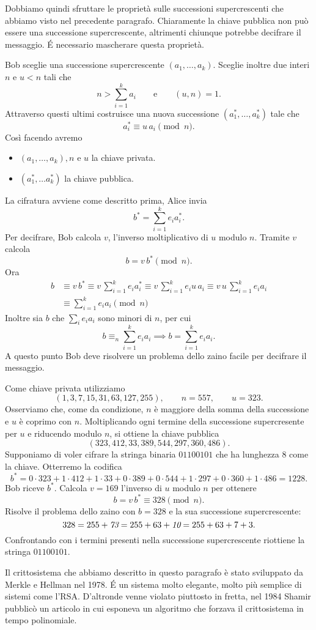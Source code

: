 	Dobbiamo quindi sfruttare le proprietà sulle successioni supercrescenti che abbiamo visto nel precedente paragrafo.
	Chiaramente la chiave pubblica non può essere una successione supercrescente, altrimenti chiunque potrebbe decifrare il messaggio. \'E necessario mascherare questa proprietà.

	Bob sceglie una successione supercrescente \((a_1,\ldots,a_k)\). Sceglie inoltre due interi \(n\) e \(u<n\) tali che
		\[
		n > \sum_{i=1}^k a_i \qquad\text{e}\qquad (u,n) = 1.
		\]
	Attraverso questi ultimi costruisce una nuova successione \((a_1^*,\ldots,a_k^*)\) tale che
		\[
		a_i^* \equiv u\,a_i \pmod{n}.
		\]
	Così facendo avremo
	\begin{itemize}
		\item \((a_1,\ldots,a_k), n\) e \(u\) la chiave privata.
		\item \((a_1^*, \ldots a_k^*)\) la chiave pubblica.
	\end{itemize}
	La cifratura avviene come descritto prima, Alice invia 
		\[
		b^* = \sum_{i=1}^k e_i a_i^*.
		\]
	Per decifrare, Bob calcola \(v\), l'inverso moltiplicativo di \(u\) modulo \(n\).
	Tramite \(v\) calcola
		\[
		b = v\,b^* \pmod{n}.
		\]
	Ora
		\[
		\begin{split}
		b & \equiv v\,b^* \equiv v\, \sum_{i=1}^k e_i a_i^* \equiv v \,\sum_{i=1}^k e_i u\,a_i\equiv v\,u\,\sum_{i=1}^k e_i a_i\\
		& \equiv \sum_{i=1}^k e_i a_i \pmod{n}
		\end{split}
		\]
	Inoltre sia \(b\) che \(\sum_{i}e_i a_i\) sono minori di \(n\), per cui
		\[
		b \equiv_n \sum_{i=1}^k e_i a_i \implies b = \sum_{i=1}^k e_i a_i.
		\]
	A questo punto Bob deve risolvere un problema dello zaino facile per decifrare il messaggio.

	\begin{ese}
	Come chiave privata utilizziamo
		\[
		(1, 3, 7, 15, 31, 63, 127, 255), \qquad n=557, \qquad u=323.
		\]
	Osserviamo che, come da condizione, \(n\) è maggiore della somma della successione e \(u\) è coprimo con \(n\).
	Moltiplicando ogni termine della successione supercresente per \(u\) e riducendo modulo \(n\), si ottiene la chiave pubblica
		\[
		(323, 412, 33, 389, 544, 297, 360, 486).
		\]
	Supponiamo di voler cifrare la stringa binaria \(01100101\) che ha lunghezza \(8\) come la chiave. Otterremo la codifica
		\[
		b^* = 0\cdot323+1\cdot412+1\cdot33 + 0\cdot389 + 0\cdot544 + 1\cdot297 + 0\cdot360 + 1\cdot486 = 1228.
		\]
	Bob riceve \(b^*\). Calcola \(v=169\) l'inverso di \(u\) modulo \(n\) per ottenere
		\[
		 b = v\,b^* \equiv 328 \pmod{n}.
		\]
	Risolve il problema dello zaino con \(b=328\) e la sua successione supercrescente:
		\[
		328 = 255 + \emph{73} = 255+63 + \emph{10} = 255+63+7+3.
		\]
	Confrontando con i termini presenti nella successione supercrescente riottiene la stringa \(01100101\).
	\end{ese}

	Il crittosistema che abbiamo descritto in questo paragrafo è stato sviluppato da Merkle e Hellman nel 1978.
	\'E un sistema molto elegante, molto più semplice di sistemi come l'RSA.
	D'altronde venne violato piuttosto in fretta, nel 1984 Shamir pubblicò un articolo in cui esponeva un algoritmo che forzava il crittosistema in tempo polinomiale.